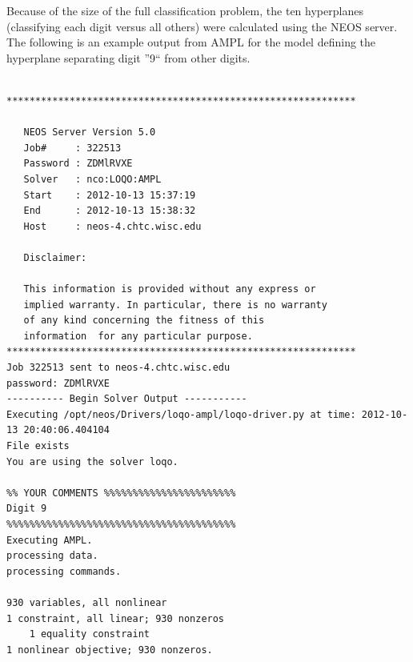 \documentclass{article}
\begin{document}
Because of the size of the full classification problem, the ten hyperplanes (classifying each digit versus all others) were calculated using the NEOS server. The following is an example output from AMPL for the model defining the hyperplane separating digit ''9`` from other digits.

\begin{verbatim}

*************************************************************

   NEOS Server Version 5.0
   Job#     : 322513
   Password : ZDMlRVXE
   Solver   : nco:LOQO:AMPL
   Start    : 2012-10-13 15:37:19
   End      : 2012-10-13 15:38:32
   Host     : neos-4.chtc.wisc.edu

   Disclaimer:

   This information is provided without any express or
   implied warranty. In particular, there is no warranty
   of any kind concerning the fitness of this
   information  for any particular purpose.
*************************************************************
Job 322513 sent to neos-4.chtc.wisc.edu
password: ZDMlRVXE
---------- Begin Solver Output -----------
Executing /opt/neos/Drivers/loqo-ampl/loqo-driver.py at time: 2012-10-13 20:40:06.404104
File exists
You are using the solver loqo.

%% YOUR COMMENTS %%%%%%%%%%%%%%%%%%%%%%%
Digit 9
%%%%%%%%%%%%%%%%%%%%%%%%%%%%%%%%%%%%%%%%
Executing AMPL.
processing data.
processing commands.

930 variables, all nonlinear
1 constraint, all linear; 930 nonzeros
	1 equality constraint
1 nonlinear objective; 930 nonzeros.


\end{verbatim}
\end{document}
